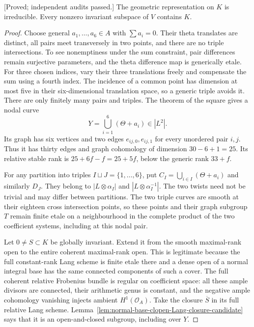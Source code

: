 \begin{lemma}
\label{lem:nonordinary-ppav-two-six-theta-comparison-candidate}
\textup{[Proved; independent audits passed.]}
The geometric representation on $K$ is irreducible. Every
nonzero invariant subspace of $V$ contains $K$.
\end{lemma}
\begin{proof}
Choose general $a_1,\ldots,a_6\in A$ with $\sum a_i=0$.
Their theta translates are distinct, all pairs meet transversely
in two points, and there are no triple intersections. To see
nonemptiness under the sum constraint, pair differences remain
surjective parameters, and the theta difference map is generically
etale. For three chosen indices, vary their three translations
freely and compensate the sum using a fourth index. The incidence
of a common point has dimension at most five in their
six-dimensional translation space, so a generic triple avoids
it. There are only finitely many pairs and triples. The theorem
of the square gives a nodal curve
\[
                    Y=\bigcup_{i=1}^6(\Theta+a_i)\in|L^2|.
\]
Its graph has six vertices and two edges $e_{ij,0},e_{ij,1}$
for every unordered pair $i,j$. Thus it has thirty edges and
graph cohomology of dimension $30-6+1=25$. Its relative stable
rank is $25+6f-f=25+5f$, below the generic rank $33+f$.

For any partition into triples $I\sqcup J=\{1,\ldots,6\}$,
put $C_I=\bigcup_{i\in I}(\Theta+a_i)$ and similarly $D_J$.
They belong to $|L\otimes\alpha_I|$ and
$|L\otimes\alpha_I^{-1}|$. The two twists need not be trivial
and may differ between partitions. The two triple curves are
smooth at their eighteen cross intersection points, so these
points and their graph subgroup $T$ remain finite etale on a
neighbourhood in the complete product of the two coefficient
systems, including at this nodal pair.

Let $0\ne S\subset K$ be globally invariant. Extend it from
the smooth maximal-rank open to the entire coherent maximal-rank
open. This is legitimate because the full constant-rank Lang
scheme is finite etale there and a dense open of a normal
integral base has the same connected components of such a
cover. The full coherent relative Frobenius bundle is regular
on coefficient space: all these ample divisors are connected,
their arithmetic genus is constant, and the negative ample
cohomology vanishing injects ambient $H^1(\mathcal O_A)$.
Take the closure $\overline S$ in its full relative Lang scheme.
Lemma~\ref{lem:normal-base-clopen-Lang-closure-candidate} says
that it is an open-and-closed subgroup, including over $Y$.


\end{proof}
